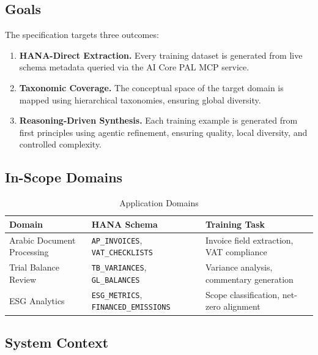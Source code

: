 \documentclass[11pt,a4paper]{article}
\begin{document}
\subsection{Goals}

The specification targets three outcomes:

\begin{enumerate}[nosep]
    \item \textbf{HANA-Direct Extraction.} Every training dataset is generated from live
          schema metadata queried via the AI Core PAL MCP service.
    \item \textbf{Taxonomic Coverage.} The conceptual space of the target domain is mapped
          using hierarchical taxonomies, ensuring global diversity.
    \item \textbf{Reasoning-Driven Synthesis.} Each training example is generated from
          first principles using agentic refinement, ensuring quality, local diversity,
          and controlled complexity.
\end{enumerate}

\subsection{In-Scope Domains}

\begin{table}[H]
\centering
\caption{Application Domains}
\label{tab:domains}
\begin{tabularx}{\textwidth}{llX}
\toprule
\textbf{Domain} & \textbf{HANA Schema} & \textbf{Training Task} \\
\midrule
Arabic Document Processing & \texttt{AP\_INVOICES}, \texttt{VAT\_CHECKLISTS} & Invoice field extraction, VAT compliance \\
Trial Balance Review & \texttt{TB\_VARIANCES}, \texttt{GL\_BALANCES} & Variance analysis, commentary generation \\
ESG Analytics & \texttt{ESG\_METRICS}, \texttt{FINANCED\_EMISSIONS} & Scope classification, net-zero alignment \\
\bottomrule
\end{tabularx}
\end{table}

\subsection{System Context}
\end{document}

